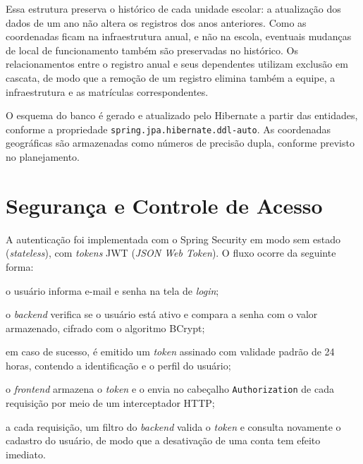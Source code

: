 Essa estrutura preserva o histórico de cada unidade escolar: a atualização dos dados de um ano não altera os registros dos anos anteriores. Como as coordenadas ficam na infraestrutura anual, e não na escola, eventuais mudanças de local de funcionamento também são preservadas no histórico. Os relacionamentos entre o registro anual e seus dependentes utilizam exclusão em cascata, de modo que a remoção de um registro elimina também a equipe, a infraestrutura e as matrículas correspondentes.


O esquema do banco é gerado e atualizado pelo Hibernate a partir das entidades, conforme a propriedade \texttt{spring.jpa.hibernate.ddl-auto}. As coordenadas geográficas são armazenadas como números de precisão dupla, conforme previsto no planejamento.

\section{Segurança e Controle de Acesso}

A autenticação foi implementada com o Spring Security em modo sem estado (\textit{stateless}), com \textit{tokens} JWT (\textit{JSON Web Token}). O fluxo ocorre da seguinte forma:

\begin{alineas}
  \item o usuário informa e-mail e senha na tela de \textit{login};
  \item o \textit{backend} verifica se o usuário está ativo e compara a senha com o valor armazenado, cifrado com o algoritmo BCrypt;
  \item em caso de sucesso, é emitido um \textit{token} assinado com validade padrão de 24 horas, contendo a identificação e o perfil do usuário;
  \item o \textit{frontend} armazena o \textit{token} e o envia no cabeçalho \texttt{Authorization} de cada requisição por meio de um interceptador HTTP;
  \item a cada requisição, um filtro do \textit{backend} valida o \textit{token} e consulta novamente o cadastro do usuário, de modo que a desativação de uma conta tem efeito imediato.
\end{alineas}

